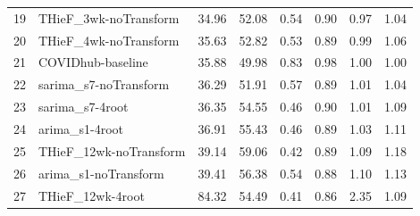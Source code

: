 \documentclass[thesis]{umassthesis}  %
\begin{document}
\begin{table}
\begin{center}
\begin{tabular}{rlrrrrrr}
  19 & THieF\_3wk-noTransform & 34.96 & 52.08 & 0.54 & 0.90 & 0.97 & 1.04 \\ 
  20 & THieF\_4wk-noTransform & 35.63 & 52.82 & 0.53 & 0.89 & 0.99 & 1.06 \\ 
  21 & COVIDhub-baseline & 35.88 & 49.98 & 0.83 & 0.98 & 1.00 & 1.00 \\ 
  22 & sarima\_s7-noTransform & 36.29 & 51.91 & 0.57 & 0.89 & 1.01 & 1.04 \\ 
  23 & sarima\_s7-4root & 36.35 & 54.55 & 0.46 & 0.90 & 1.01 & 1.09 \\ 
  24 & arima\_s1-4root & 36.91 & 55.43 & 0.46 & 0.89 & 1.03 & 1.11 \\ 
  25 & THieF\_12wk-noTransform & 39.14 & 59.06 & 0.42 & 0.89 & 1.09 & 1.18 \\ 
  26 & arima\_s1-noTransform & 39.41 & 56.38 & 0.54 & 0.88 & 1.10 & 1.13 \\ 
  27 & THieF\_12wk-4root & 84.32 & 54.49 & 0.41 & 0.86 & 2.35 & 1.09 \\ 
   \hline
\end{tabular}\end{center}
\end{table}
\end{document}
